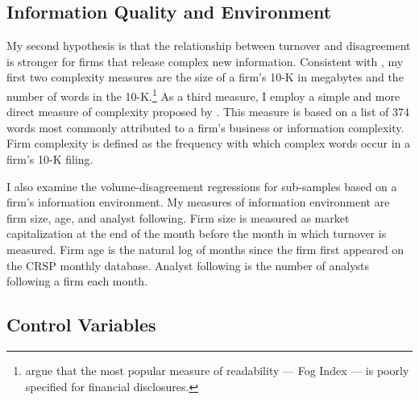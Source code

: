 \documentclass[
  12pt,
  a4paper,
  twoside,
  onecolumn]{article}
\begin{document}
\hypertarget{information-quality-and-environment}{%
\subsection{Information Quality and
Environment}\label{information-quality-and-environment}}

My second hypothesis is that the relationship between turnover and
disagreement is stronger for firms that release complex new information.
Consistent with \cite{lm_2014_readability}, my first two complexity
measures are the size of a firm's 10-K in megabytes and the number of
words in the 10-K.\footnote{\cite{lm_2014_readability} argue that the
  most popular measure of readability --- Fog Index --- is poorly
  specified for financial disclosures.} As a third measure, I employ a
simple and more direct measure of complexity proposed by
\cite{lm_2020_firm_complexity}. This measure is based on a list of 374
words most commonly attributed to a firm's business or information
complexity. Firm complexity is defined as the frequency with which
complex words occur in a firm's 10-K filing.

I also examine the volume-disagreement regressions for sub-samples based
on a firm's information environment. My measures of information
environment are firm size, age, and analyst following. Firm size is
measured as market capitalization at the end of the month before the
month in which turnover is measured. Firm age is the natural log of
months since the firm first appeared on the CRSP monthly database.
Analyst following is the number of analysts following a firm each month.

\hypertarget{control-variables}{%
\subsection{Control Variables}\label{control-variables}}
\end{document}
